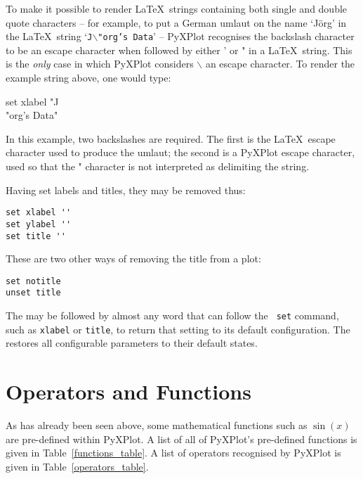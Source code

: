 To make it possible to render \LaTeX\ strings containing both single and double
quote characters -- for example, to put a German umlaut on the name `J\"org' in
the \LaTeX\ string `{\tt J$\backslash$"org's Data}' -- PyXPlot recognises
the backslash character to be an escape character when followed by either ' or
" in a \LaTeX\ string. This is the \textit{only} case in which PyXPlot
considers $\backslash$ an escape character. To render the example string above,
one would type:

\begin{dodo}
set xlabel "J\\"org's Data"
\end{dodo}

\noindent In this example, two backslashes are required.  The first is the
\LaTeX\ escape character used to produce the umlaut; the second is a PyXPlot
escape character, used so that the " character is not interpreted as
delimiting the string. 

Having set labels and titles, they may be removed thus:

\begin{verbatim}
set xlabel ''
set ylabel ''
set title ''
\end{verbatim}

\noindent These are two other ways of removing the title from a plot:

\begin{verbatim}
set notitle
unset title
\end{verbatim}

The  may be followed by almost any word that can follow the {\tt
set} command, such as {\tt xlabel} or {\tt title}, to return that setting to
its default configuration. The  restores all configurable
parameters to their default states.

\section{Operators and Functions}

As has already been seen above, some mathematical functions such as $\sin(x)$
are pre-defined within PyXPlot. A list of all of PyXPlot's pre-defined
functions is given in Table~\ref{functions_table}. A list of operators
recognised by PyXPlot is given in
Table~\ref{operators_table}.

